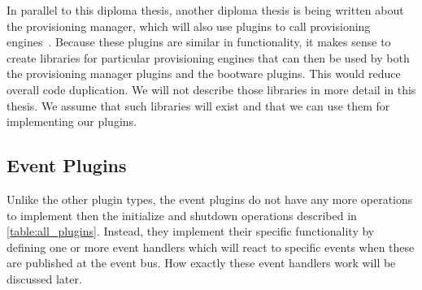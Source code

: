 In parallel to this diploma thesis, another diploma thesis is being written about the provisioning manager, which will also use plugins to call provisioning engines~\autocite{nedim}.
Because these plugins are similar in functionality, it makes sense to create libraries for particular provisioning engines that can then be used by both the provisioning manager plugins and the bootware plugins.
This would reduce overall code duplication.
We will not describe those libraries in more detail in this thesis.
We assume that such libraries will exist and that we can use them for implementing our plugins.

\subsection{Event Plugins}

Unlike the other plugin types, the event plugins do not have any more operations to implement then the initialize and shutdown operations described in \autoref{table:all_plugins}.
Instead, they implement their specific functionality by defining one or more event handlers which will react to specific events when these are published at the event bus.
How exactly these event handlers work will be discussed later.
